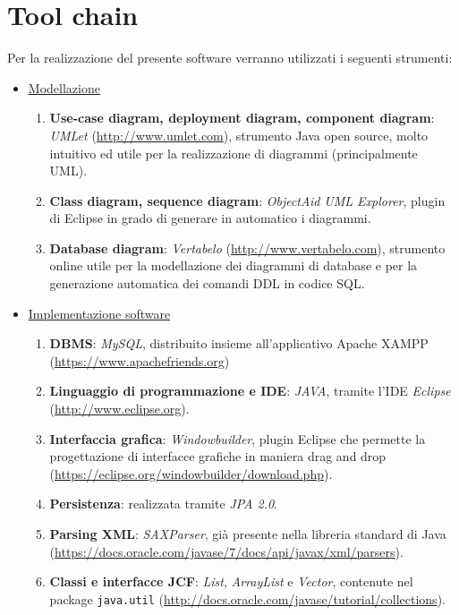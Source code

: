 \section{Tool chain}
Per la realizzazione del presente software verranno utilizzati i seguenti strumenti:
\begin{itemize}
	\item \underline{Modellazione}
		\begin{enumerate}
			\item \textbf{Use-case diagram, deployment diagram, component diagram}: \textit{UMLet} (\href{http://www.umlet.com}{http://www.umlet.com}), strumento Java open source, molto intuitivo ed utile per la realizzazione di diagrammi (principalmente UML).
			\item \textbf{Class diagram, sequence diagram}: \textit{ObjectAid UML Explorer}, plugin di Eclipse in grado di generare in automatico i diagrammi.
			\item \textbf{Database diagram}: \textit{Vertabelo} (\href{http://www.vertabelo.com}{http://www.vertabelo.com}), strumento online utile per la modellazione dei diagrammi di database e per la generazione automatica dei comandi DDL in codice SQL.
		\end{enumerate}
	\item \underline{Implementazione software}
		\begin{enumerate}
			\item \textbf{DBMS}: \textit{MySQL}, distribuito insieme all'applicativo Apache XAMPP (\href{https://www.apachefriends.org/it/index.html}{https://www.apachefriends.org})
			\item \textbf{Linguaggio di programmazione e IDE}: \textit{JAVA}, tramite l'IDE \textit{Eclipse} (\href{http://www.eclipse.org}{http://www.eclipse.org}).
			\item \textbf{Interfaccia grafica}: \textit{Windowbuilder}, plugin Eclipse che permette la progettazione di interfacce grafiche in maniera drag and drop (\href{https://eclipse.org/windowbuilder/download.php}{https://eclipse.org/windowbuilder/download.php}).
			\item \textbf{Persistenza}: realizzata tramite \textit{JPA 2.0}.
			\item \textbf{Parsing XML}: \textit{SAXParser}, già presente nella libreria standard di Java (\href{https://docs.oracle.com/javase/7/docs/api/javax/xml/parsers/SAXParser.html}{https://docs.oracle.com/javase/7/docs/api/javax/xml/parsers}).
			\item \textbf{Classi e interfacce JCF}: \textit{List}, \textit{ArrayList} e \textit{Vector}, contenute nel package \verb|java.util| (\href{http://docs.oracle.com/javase/tutorial/collections/index.html}{http://docs.oracle.com/javase/tutorial/collections}). \\

\end{enumerate}
\end{itemize}
